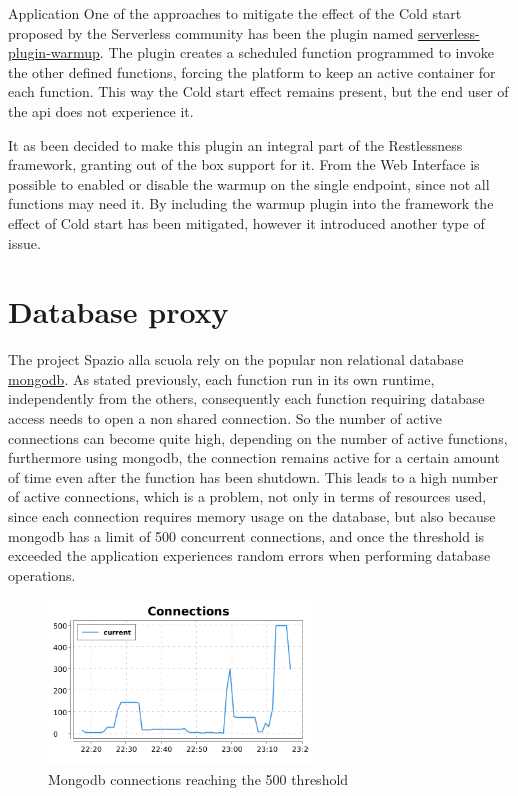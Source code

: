 \begin{chapter}{Application}
    One of the approaches to mitigate the effect of the Cold start proposed by the
    Serverless community has been the plugin named
    \href{https://www.npmjs.com/package/serverless-plugin-warmup}{serverless-plugin-warmup}.
    The plugin creates a scheduled function programmed to invoke the other defined functions,
    forcing the platform to keep an active container for each function.
    This way the Cold start effect remains present, but the end user of the api does
    not experience it.

    It as been decided to make this plugin an integral part of the Restlessness framework,
    granting out of the box support for it. From the Web Interface is possible to
    enabled or disable the warmup on the single endpoint, since not all functions may
    need it.
    By including the warmup plugin into the framework the effect of Cold start has
    been mitigated, however it introduced another type of issue.

    \section{Database proxy}
    The project Spazio alla scuola rely on the popular non relational database
    \href{https://www.mongodb.com}{mongodb}. As stated previously, each function
    run in its own runtime, independently from the others, consequently each function
    requiring database access needs to open a non shared connection.
    So the number of active connections can become quite high, depending on the number
    of active functions, furthermore using mongodb, the connection remains active for
    a certain amount of time even after the function has been shutdown.
    This leads to a high number of active connections, which is a problem, not only
    in terms of resources used, since each connection requires memory usage on the
    database, but also because mongodb has a limit of 500 concurrent connections,
    and once the threshold is exceeded the application experiences random errors when
    performing database operations.
    \begin{figure}
        \centering
        \includegraphics[width=7cm]{source/images/mongo-connections.png}
        \caption{Mongodb connections reaching the 500 threshold}
    \end{figure}


\end{chapter}
